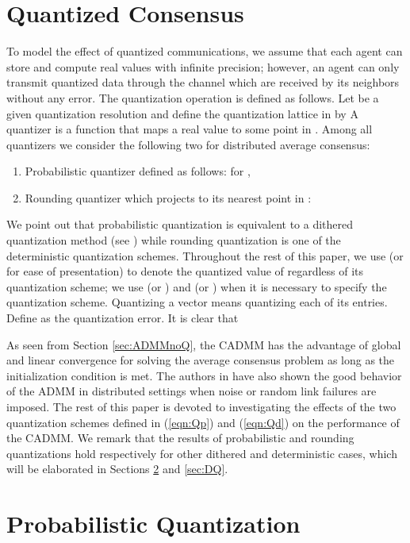 \documentclass[journal]{IEEEtran}
\begin{document}
\section{Quantized Consensus}
\label{sec:problemformulation}
To model the effect of quantized communications, we assume that each agent can store and compute real values with infinite precision; however, an agent can only transmit quantized data through the channel which are received by its neighbors without any error. The quantization operation is defined as follows. Let  be a given quantization resolution and define the quantization lattice in  by  A quantizer is a function  that maps a real value to some point in . 
Among all quantizers we consider the following two for distributed average consensus:
\begin{enumerate}
\item Probabilistic quantizer  defined as follows:
for ,
\item Rounding quantizer  which projects  to its nearest point in :
\end{enumerate}
We point out that probabilistic quantization is equivalent to a dithered quantization method (see \cite[Lemma 2]{Aysal2008}) while rounding quantization is one of the deterministic quantization schemes. Throughout the rest of this paper, we use  (or  for ease of presentation) to denote the quantized value of  regardless of its quantization scheme; we use  (or ) and  (or ) when it is necessary to specify the quantization scheme. Quantizing a vector means quantizing each of its entries. Define  as the quantization error. It is clear that





As seen from Section \ref{sec:ADMMnoQ}, the CADMM has the advantage of global and linear convergence for solving the average consensus problem as long as the initialization condition is met.  The authors in \cite{Zhu2009, Erseghe2011} have also shown the good behavior of the ADMM in distributed settings when noise or random link failures are imposed. The rest of this paper is devoted to investigating the effects of the two quantization schemes defined in (\ref{eqn:Qp}) and (\ref{eqn:Qd}) on the performance of the CADMM. We remark that the results of probabilistic and rounding quantizations hold respectively for other dithered and deterministic cases, which will be elaborated in Sections \ref{sec:PQ} and \ref{sec:DQ}. 




\section{Probabilistic Quantization}
\label{sec:PQ}
\end{document}
